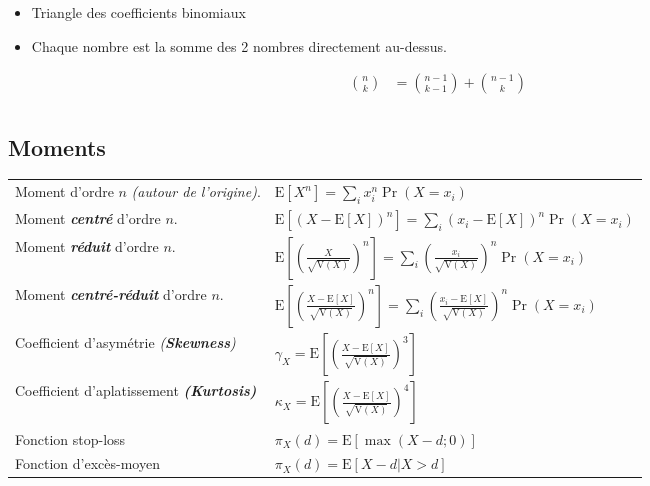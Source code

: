 \documentclass[10pt, french]{article}
\begin{document}
\begin{multicols*}{2}
\begin{minipage}{0.4\linewidth}
\begin{tikzpicture}[x=0.75pt,y=0.75pt,yscale=-1,xscale=1]
\end{tikzpicture}
\end{minipage}
\begin{minipage}{0.6\linewidth}

\begin{itemize}
	\item	Triangle des coefficients binomiaux
	\item 	Chaque nombre est la somme des 2 nombres directement au-dessus.
\end{itemize}

\begin{align*}
	\binom{n}{k}
		&=	\binom{n - 1}{k - 1} + \binom{n - 1}{k}		\\
\end{align*}
\end{minipage}

\subsection*{Moments}

\begin{tabular}{| l | l |}
\hline
	Moment d'ordre $n$ \textit{(autour de l'origine)}.	&	$\text{E}[X^{n}] = \underset{i}{\sum} x_{i}^{n} \Pr(X = x_{i})$	\\
	Moment \textbf{\textit{centré}} d'ordre $n$.	&	$\text{E}[(X - \text{E}[X])^{n}] = \underset{i}{\sum} (x_{i} - \text{E}[X])^{n} \Pr(X = x_{i})$	\\
	Moment \textbf{\textit{réduit}} d'ordre $n$.&	$\text{E}\left[\left(\frac{X}{\sqrt{\text{V}(X)}}\right)^{n}\right] = \underset{i}{\sum} \left(\frac{x_{i}}{\sqrt{\text{V}(X)}}\right)^{n} \Pr(X = x_{i})$	\\
	Moment \textbf{\textit{centré-réduit}} d'ordre $n$.	&	$\text{E}\left[\left(\frac{X - \text{E}[X]}{\sqrt{\text{V}(X)}}\right)^{n}\right] = \underset{i}{\sum} \left(\frac{x_{i} - \text{E}[X]}{\sqrt{\text{V}(X)}}\right)^{n} \Pr(X = x_{i})$	\\
	Coefficient d'asymétrie \textit{(\textbf{Skewness})} 	&	$\gamma_{X} = \text{E}\left[\left(\frac{X - \text{E}[X]}{\sqrt{\text{V}(X)}}\right)^{3}\right]$	\\
	Coefficient d'aplatissement \textit{\textbf{(Kurtosis)}} 	&	$\kappa_{X} = \text{E}\left[\left(\frac{X - \text{E}[X]}{\sqrt{\text{V}(X)}}\right)^{4}\right]$	\\
	Fonction stop-loss 	&	$\pi_{X}(d) = \text{E}\left[\max(X - d; 0)\right]$	\\
	Fonction d'excès-moyen 	&	$\pi_{X}(d) = \text{E}\left[X - d | X > d\right]$	\\	\hline
\end{tabular}


\end{multicols*}
\end{document}
